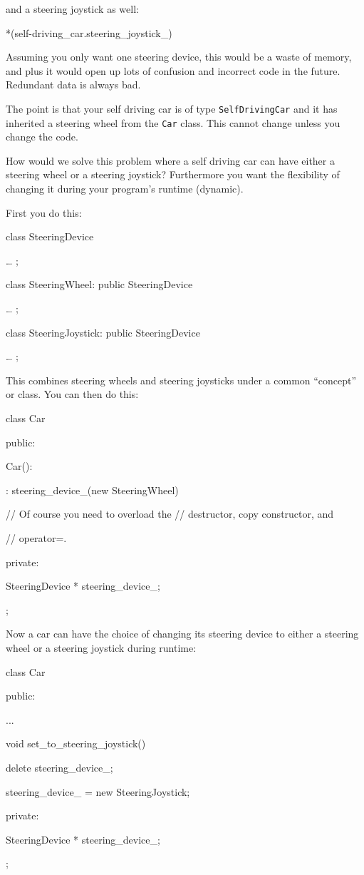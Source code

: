 and a steering joystick as well:

*(self-driving_car.steering_joystick_)

Assuming you only want one steering device, this would be a waste of
memory, and plus it would open up lots of confusion and incorrect code
in the future. Redundant data is always bad.

The point is that your self driving car is of type \texttt{SelfDrivingCar}
and it has inherited a steering wheel from the \texttt{Car} class. This
cannot change unless you change the code.

How would we solve this problem where a self driving car can have either
a steering wheel or a steering joystick? Furthermore you want the
flexibility of changing it during your program's runtime (dynamic).

First you do this:

class SteeringDevice

{ \ldots{} };

class SteeringWheel: public SteeringDevice

{ \ldots{} };

class SteeringJoystick: public SteeringDevice

{ \ldots{} };

This combines steering wheels and steering joysticks under a common
``concept'' or class. You can then do this:

class Car

{

public:

Car():

: steering_device_(new SteeringWheel)

{}

// Of course you need to overload the // destructor, copy constructor,
and

// operator=.

private:

SteeringDevice * steering_device_;

};

Now a car can have the choice of changing its steering device to either
a steering wheel or a steering joystick during runtime:

class Car

{

public:

...

void set_to_steering_joystick()

{

delete steering_device_;

steering_device_ = new SteeringJoystick;

}

private:

SteeringDevice * steering_device_;

};

